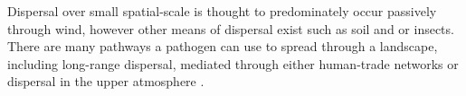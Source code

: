 


% 

%


Dispersal over small spatial-scale is thought to predominately occur passively through wind, however other means of dispersal exist such as soil and or insects. There are many pathways a pathogen can use to spread through a landscape, including long-range dispersal, mediated through either human-trade networks %
\cite{hulme2009trade, banks2015role, chapman2017global} or dispersal in the upper atmosphere \cite{westbrook1999atmospheric, isard2005principles}.  

